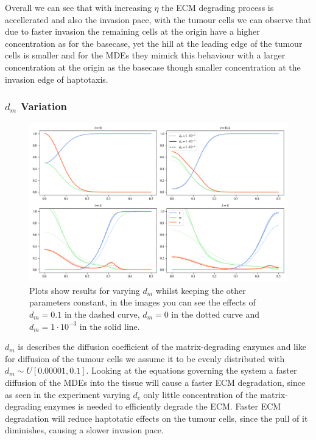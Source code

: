 Overall we can see that with increasing $\eta$ the ECM degrading process is accellerated and also the invasion pace, with the tumour cells we can observe that due to faster invasion the remaining cells at the origin have a higher concentration as for the basecase, yet the hill at the leading edge of the tumour cells is smaller and for the MDEs they mimick this behaviour with a larger concentration at the origin as the basecase though smaller concentration at the invasion edge of haptotaxis.

\subsubsection*{$d_m$ Variation}
\begin{figure}[h]
    \centering
    \includegraphics[width=\textwidth]{resources/images/dm_variation.png}
    \caption{Plots show results for varying $d_m$ whilst keeping the other parameters constant, in the images you can see the effects of $d_m=0.1$ in the dashed curve, $d_m=0$ in the dotted curve and $d_m=1\cdot 10^{-3}$ in the solid line.}
    \label{fig:dm_variation}
\end{figure}
$d_m$ is describes the diffusion coefficient of the matrix-degrading enzymes and like for diffusion of the tumour cells we assume it to be evenly distributed with $d_m \sim U[0.00001,0.1]$. Looking at the equations governing the system a faster diffusion of the MDEs into the tissue will cause a faster ECM degradation, since as seen in the experiment varying $d_c$ only little concentration of the matrix-degrading enzymes is needed to efficiently degrade the ECM. Faster ECM degradation will reduce haptotatic effects on the tumour cells, since the pull of it diminishes, causing a slower invasion pace. \newline 
